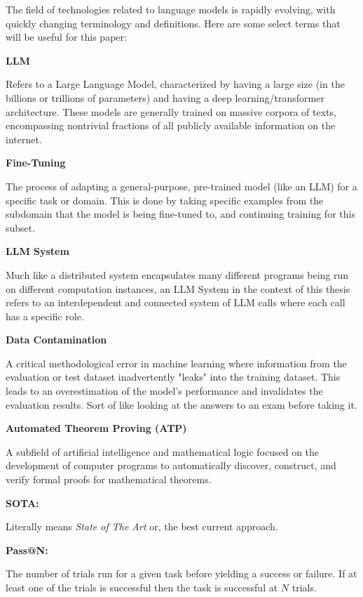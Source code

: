 \documentclass[12pt, letterpaper]{article}
\begin{document}
The field of technologies related to language models is rapidly evolving, with quickly changing terminology and definitions. Here are some select terms that will be useful for this paper:


\textbf{LLM}

Refers to a Large Language Model, characterized by having a large size (in the billions or trillions of parameters) and having a deep learning/transformer architecture. These models are generally trained on massive corpora of texts, encompassing nontrivial fractions of all publicly available information on the internet.


\textbf{Fine-Tuning}

The process of adapting a general-purpose, pre-trained model (like an LLM) for a specific task or domain. This is done by taking specific examples from the subdomain that the model is being fine-tuned to, and continuing training for this subset.

\textbf{LLM System}

Much like a distributed system encapsulates many different programs being run on different computation instances, an LLM System in the context of this thesis refers to an interdependent and connected system of LLM calls where each call has a specific role.

\textbf{Data Contamination}


A critical methodological error in machine learning where information from the evaluation or test dataset inadvertently "leaks" into the training dataset. This leads to an overestimation of the model's performance and invalidates the evaluation results. Sort of like looking at the answers to an exam before taking it.

\textbf{Automated Theorem Proving (ATP)}

A subfield of artificial intelligence and mathematical logic focused on the development of computer programs to automatically discover, construct, and verify formal proofs for mathematical theorems.


\textbf{SOTA:} 


Literally means \textit{State of The Art} or, the best current approach.

\textbf{Pass@N:} 

The number of trials run for a given task before yielding a success or failure. If at least one of the trials is successful then the task is successful at $N$ trials.
\end{document}
